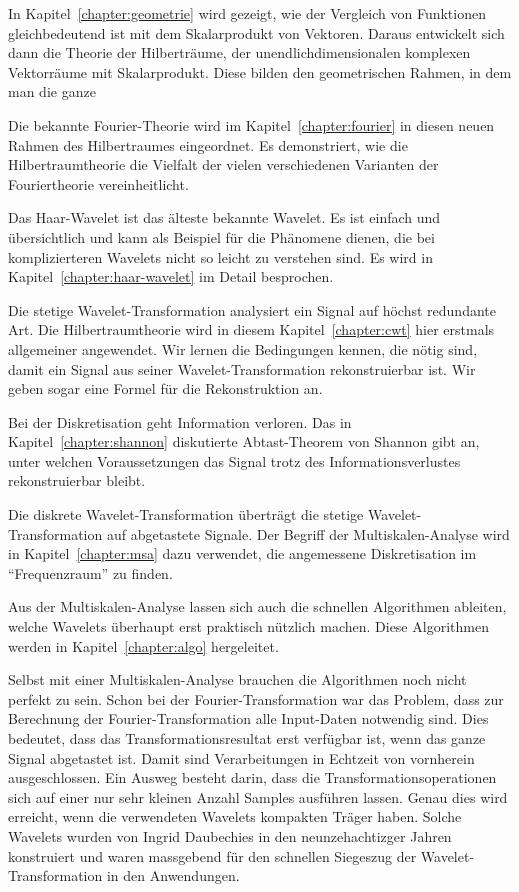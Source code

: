 In Kapitel~\ref{chapter:geometrie} wird gezeigt, wie der Vergleich
von Funktionen gleichbedeutend ist mit dem Skalarprodukt von Vektoren.
Daraus entwickelt sich dann die Theorie der Hilberträume, der
unendlichdimensionalen komplexen Vektorräume mit Skalarprodukt.
Diese bilden den geometrischen Rahmen, in dem man die ganze 

Die bekannte Fourier-Theorie wird im Kapitel~\ref{chapter:fourier} in
diesen neuen Rahmen des Hilbertraumes eingeordnet.
Es demonstriert, wie die Hilbertraumtheorie die Vielfalt der vielen
verschiedenen Varianten der Fouriertheorie vereinheitlicht.

Das Haar-Wavelet ist das älteste bekannte Wavelet.
Es ist einfach und übersichtlich und kann als Beispiel für die
Phänomene dienen, die bei komplizierteren Wavelets nicht so leicht
zu verstehen sind.
Es wird in Kapitel~\ref{chapter:haar-wavelet} im Detail besprochen.

Die stetige Wavelet-Transformation analysiert ein Signal auf höchst
redundante Art.
Die Hilbertraumtheorie wird in diesem Kapitel~\ref{chapter:cwt} hier
erstmals allgemeiner angewendet.
Wir lernen die Bedingungen kennen, die nötig sind, damit ein Signal
aus seiner Wavelet-Transformation rekonstruierbar ist.
Wir geben sogar eine Formel für die Rekonstruktion an.

Bei der Diskretisation geht Information verloren.
Das in Kapitel~\ref{chapter:shannon} diskutierte Abtast-Theorem
von Shannon gibt an, unter welchen Voraussetzungen das Signal trotz
des Informationsverlustes rekonstruierbar bleibt.

Die diskrete Wavelet-Transformation überträgt die stetige
Wavelet-Transformation auf abgetastete Signale.
Der Begriff der Multiskalen-Analyse wird in Kapitel~\ref{chapter:msa}
dazu verwendet, die angemessene Diskretisation im ``Frequenzraum''
zu finden.

Aus der Multiskalen-Analyse lassen sich auch die schnellen Algorithmen
ableiten, welche Wavelets überhaupt erst praktisch nützlich machen.
Diese Algorithmen werden in Kapitel~\ref{chapter:algo} hergeleitet.

Selbst mit einer Multiskalen-Analyse brauchen die Algorithmen noch nicht
perfekt zu sein.
Schon bei der Fourier-Transformation war das Problem, dass zur Berechnung
der Fourier-Trans\-for\-ma\-tion alle Input-Daten notwendig sind.
Dies bedeutet, dass das Transformationsresultat erst verfügbar ist,
wenn das ganze Signal abgetastet ist.
Damit sind Verarbeitungen in Echtzeit von vornherein ausgeschlossen.
Ein Ausweg besteht darin, dass die Transformationsoperationen sich auf
einer nur sehr kleinen Anzahl Samples ausführen lassen.
Genau dies wird erreicht, wenn die verwendeten Wavelets kompakten Träger
haben.
Solche Wavelets wurden von Ingrid Daubechies in den neunzehachtizger
Jahren konstruiert und waren massgebend für den schnellen Siegeszug 
der Wavelet-Transformation in den Anwendungen.


